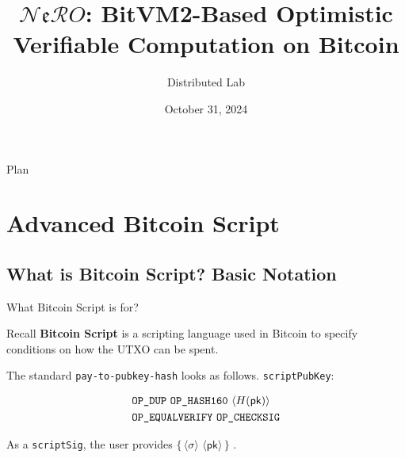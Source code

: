 \documentclass{zkdl-presentation-template}
\title[BitVM2 Made Practical]{\textbf{$\mathcal{N}\mathfrak{e}\mathcal{R}O$: BitVM2-Based Optimistic Verifiable Computation on Bitcoin}}
\author{Distributed Lab}
\date{October 31, 2024}
\newcommand{\elem}[1]{\, \langle #1 \rangle \,}
\newcommand{\opcode}[1]{\, \texttt{#1} \,}
\newcommand{\script}[1]{ $\big\{ #1 \big\}$ }
\begin{document}
 
	\begin{frame}{Plan}
        \tableofcontents
    \end{frame}

	\section{Advanced Bitcoin Script}

    \subsection{What is Bitcoin Script? Basic Notation}

    \begin{frame}{What Bitcoin Script is for?}
        \begin{block}{Recall}
            \textbf{Bitcoin Script} is a scripting language used in Bitcoin to specify conditions on how the UTXO can be spent.
        \end{block}

        \begin{example}
            The standard \texttt{pay-to-pubkey-hash} looks as follows. \texttt{scriptPubKey}:
              \begin{empheqboxed}
                \small
                \begin{align*}
                    &\opcode{\texttt{OP\_DUP}} \opcode{\texttt{OP\_HASH160}} \elem{H(\mathsf{pk})} \\ &\opcode{OP\_EQUALVERIFY} 
                    \opcode{OP\_CHECKSIG}
                \end{align*}
              \end{empheqboxed}

            As a \texttt{scriptSig}, the user provides \script{\elem{\sigma} \elem{\mathsf{pk}}}.
        \end{example}
    \end{frame}
\end{document}
